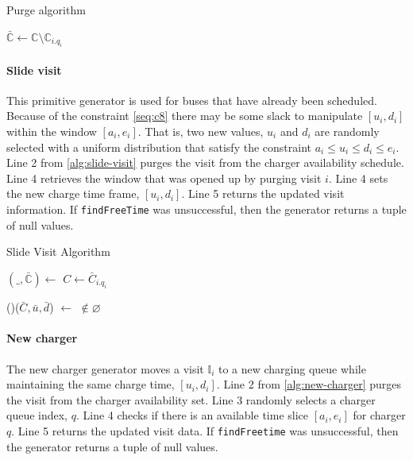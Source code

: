 \documentclass[11pt,a4paper,final]{article}
\newcommand{\I}{\mathbb{I}}                 %
\newcommand{\C}{\mathbb{C}}                 %
\newcommand{\Sol}{\mathbb{S}}               %
\begin{document}
\begin{algorithm}[H]
  \caption{Purge algorithm} \label{alg:purge}
    \LinesNumbered
    \KwIn{$\Sol$}
    \KwOut{$\bar{\Sol}$}

    \Begin
    { $\bar{\C} \leftarrow \C \setminus \C_{i.q_i}$ \Return{$(\_,
        \bar{\C})$} }
  \end{algorithm}

\paragraph{Slide visit}
\label{slide-visit}
This primitive generator is used for buses that have already been scheduled. Because of the constraint \ref{seq:c8}
there may be some slack to manipulate \([u_i, d_i]\) within the window \([a_i, e_i]\). That is, two new values, \(u_i\) and
\(d_i\) are randomly selected with a uniform distribution that satisfy the constraint \(a_i \leq u_i \leq d_i \leq e_i\). Line 2 from
\ref{alg:slide-visit} purges the visit from the charger availability schedule. Line 4 retrieves the window that was
opened up by purging visit \(i\). Line 4 sets the new charge time frame, \([u_i, d_i]\). Line 5 returns the updated visit
information. If \texttt{findFreeTime} was unsuccessful, then the generator returns a tuple of null values.

\begin{algorithm}[H]
  \caption{Slide Visit Algorithm} \label{alg:slide-visit}
  \LinesNumbered
  \KwIn{$\Sol$}
  \KwOut{$\bar{\Sol}$}


    \Begin
    {
      $(\_, \bar{\C}) \leftarrow$\Purge{$\Sol$}
      $C \leftarrow \bar{C}_{i.q_i}$

        \If(){($\bar{C}, \bar{u}, \bar{d}$) $\leftarrow$ \findFreeTime{$C$, $\Sol_i$, $\I_q$, $\I_{i.a}, \I_{i.e}$} $\not\in \varnothing$}
        {
          \Return{($\_, (\I_{i.q_i},\bar{u},\bar{d}),\bar{C}$)}
        }

        \Return{($\varnothing$)}
    }
  \end{algorithm}

\paragraph{New charger}
\label{new-charger}
The new charger generator moves a visit \(\I_i\) to a new charging queue while maintaining the same charge time, \([u_i,
d_i]\). Line 2 from \ref{alg:new-charger} purges the visit from the charger availability set. Line 3 randomly selects a
charger queue index, \(q\). Line 4 checks if there is an available time slice \([a_i, e_i]\) for charger \(q\). Line 5 returns
the updated visit data. If \texttt{findFreetime} was unsuccessful, then the generator returns a tuple of null values.
\end{document}
